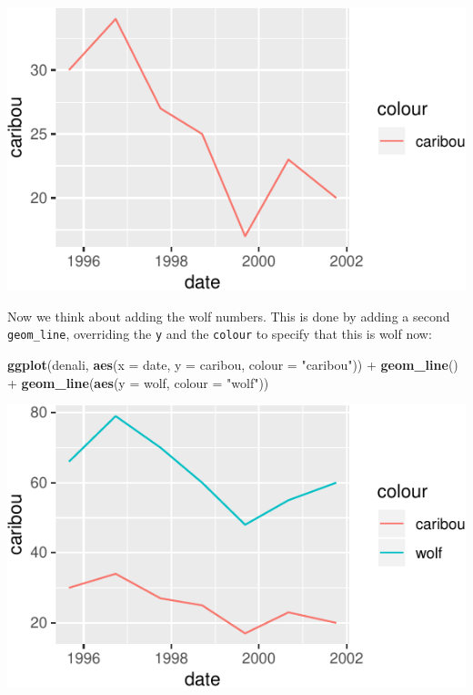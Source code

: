 \documentclass[]{tufte-book}
\newenvironment{Shaded}{}{}
\newcommand{\DataTypeTok}[1]{\textcolor[rgb]{0.56,0.13,0.00}{#1}}
\newcommand{\KeywordTok}[1]{\textcolor[rgb]{0.00,0.44,0.13}{\textbf{#1}}}
\newcommand{\NormalTok}[1]{#1}
\newcommand{\OperatorTok}[1]{\textcolor[rgb]{0.40,0.40,0.40}{#1}}
\newcommand{\StringTok}[1]{\textcolor[rgb]{0.25,0.44,0.63}{#1}}
\theoremstyle{definition}
\theoremstyle{definition}
\theoremstyle{definition}
\theoremstyle{remark}
\begin{document}
\includegraphics{13-dates-and-times_files/figure-latex/unnamed-chunk-38-1}

Now we think about adding the wolf numbers. This is done by adding a
second \texttt{geom\_line}, overriding the \texttt{y} and the
\texttt{colour} to specify that this is wolf now:

\begin{Shaded}
\begin{Highlighting}[]
\KeywordTok{ggplot}\NormalTok{(denali, }\KeywordTok{aes}\NormalTok{(}\DataTypeTok{x =}\NormalTok{ date, }\DataTypeTok{y =}\NormalTok{ caribou, }\DataTypeTok{colour =} \StringTok{"caribou"}\NormalTok{)) }\OperatorTok{+}\StringTok{ }
\StringTok{    }\KeywordTok{geom_line}\NormalTok{() }\OperatorTok{+}\StringTok{ }\KeywordTok{geom_line}\NormalTok{(}\KeywordTok{aes}\NormalTok{(}\DataTypeTok{y =}\NormalTok{ wolf, }\DataTypeTok{colour =} \StringTok{"wolf"}\NormalTok{))}
\end{Highlighting}
\end{Shaded}

\includegraphics{13-dates-and-times_files/figure-latex/unnamed-chunk-39-1}
\end{document}
